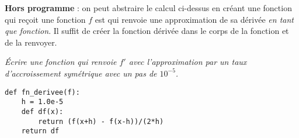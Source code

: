 {\bf Hors programme} : on peut abstraire le calcul ci-dessus en créant une fonction qui reçoit une fonction $f$ est qui renvoie une approximation de sa dérivée {\it en tant que fonction}. Il suffit de créer la fonction dérivée dans le corps de la fonction et de la renvoyer.
\begin{Exercise}[title={Fonction dérivée}]
\it Écrire une fonction  qui renvoie $f'$ avec l'approximation par un taux d'accroissement symétrique avec un pas de $10^{-5}$.
\end{Exercise}
\begin{Answer}
\begin{lstlisting}
def fn_derivee(f):
    h = 1.0e-5
    def df(x):
        return (f(x+h) - f(x-h))/(2*h)
    return df
\end{lstlisting}
\end{Answer} 











